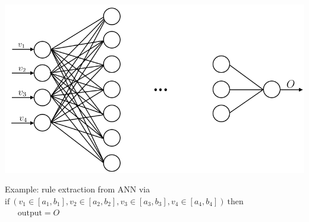 \documentclass[presentation]{beamer}
\begin{document}
\begin{frame}[allowframebreaks]
	\framebreak
	
	\centering
	\includegraphics[width=.75\linewidth]{img/mlp.png}
	
	\begin{exampleblock}{Example: rule extraction from ANN via \iter}
		$ \text{if} ~ (v_1 \in [a_1, b_1], v_2 \in [a_2, b_2], v_3 \in [a_3, b_3], v_4 \in [a_4, b_4]) ~ \text{then} $ \\
		$ ~~~~~~~\text{output} = O $
	\end{exampleblock}	
\end{frame}
\end{document}

